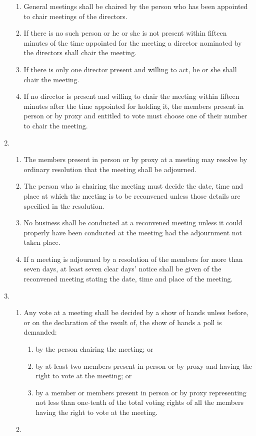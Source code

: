 \begin{enumerate}
  \begin{enumerate}
  \item
    General meetings shall be chaired by the person who has been
    appointed to chair meetings of the directors.
  \item
    If there is no such person or he or she is not present within
    fifteen minutes of the time appointed for the meeting a director
    nominated by the directors shall chair the meeting.
  \item
    If there is only one director present and willing to act, he or she
    shall chair the meeting.
  \item
    If no director is present and willing to chair the meeting within
    fifteen minutes after the time appointed for holding it, the
    members present in person or by proxy and entitled to vote must
    choose one of their number to chair the meeting.
  \end{enumerate}
\item
  

  \begin{enumerate}
  \item
    The members present in person or by proxy at a meeting may resolve
    by ordinary resolution that the meeting shall be adjourned.
  \item
    The person who is chairing the meeting must decide the date, time
    and place at which the meeting is to be reconvened unless those
    details are specified in the resolution.
  \item
    No business shall be conducted at a reconvened meeting unless it
    could properly have been conducted at the meeting had the
    adjournment not taken place.
  \item
    If a meeting is adjourned by a resolution of the members for more
    than seven days, at least seven clear days' notice shall be given
    of the reconvened meeting stating the date, time and place of the
    meeting.
  \end{enumerate}
\item
  

  \begin{enumerate}
  \item
    Any vote at a meeting shall be decided by a show of hands unless
    before, or on the declaration of the result of, the show of hands a
    poll is demanded:
    \begin{enumerate}
    \item
      by the person chairing the meeting; or
    \item
      by at least two members present in person or by proxy and having
      the right to vote at the meeting; or
    \item
      by a member or members present in person or by proxy representing
      not less than one-tenth of the total voting rights of all the
      members having the right to vote at the meeting.
    \end{enumerate}
  \item
    


\end{enumerate}
\end{enumerate}
